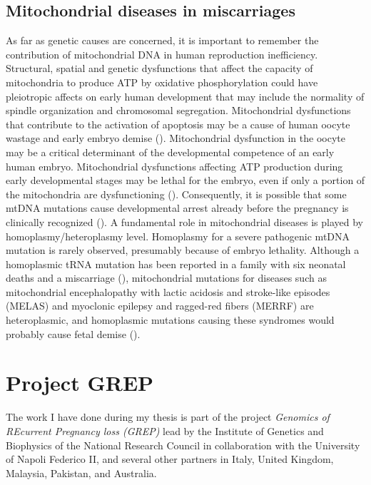 \subsection{Mitochondrial diseases in miscarriages}

As far as genetic causes are concerned, it is important to remember the contribution of mitochondrial DNA in human reproduction inefficiency. 
Structural, spatial and genetic dysfunctions that affect the capacity of mitochondria to produce ATP by oxidative phosphorylation could have pleiotropic affects on early human development that may include the normality of spindle organization and chromosomal segregation. Mitochondrial dysfunctions that contribute to the activation of apoptosis may be a cause of human oocyte wastage and early embryo demise (\cite{van2004mitochondria}).
Mitochondrial dysfunction in the oocyte may be a critical determinant of the developmental competence of an early human embryo. Mitochondrial dysfunctions affecting ATP production during early developmental stages may be lethal for the embryo, even if only a portion of the mitochondria are dysfunctioning (\cite{karaa2019effects,kaare2009mitochondrial}). Consequently, it is possible that some mtDNA mutations cause developmental arrest already before the pregnancy is clinically recognized (\cite{van2004mitochondria}). A fundamental role in mitochondrial diseases is played by homoplasmy/heteroplasmy level.
Homoplasmy for a severe pathogenic mtDNA mutation is rarely observed, presumably because of embryo lethality. 
Although a homoplasmic tRNA mutation has been reported in a family with six neonatal deaths and a miscarriage (\cite{mcfarland2002multiple}), mitochondrial mutations for diseases such as mitochondrial encephalopathy with lactic acidosis and stroke-like episodes (MELAS) and myoclonic epilepsy and ragged-red fibers (MERRF) are heteroplasmic, and homoplasmic mutations causing these syndromes would probably cause fetal demise (\cite{van2004mitochondria}).


\section{Project GREP}
The work I have done during my thesis is part of the project \textit{Genomics of REcurrent Pregnancy loss (GREP)} lead by the Institute of Genetics and Biophysics of the National Research Council in collaboration with the University of Napoli Federico II, and several other partners in Italy, United Kingdom, Malaysia, Pakistan, and Australia.  

